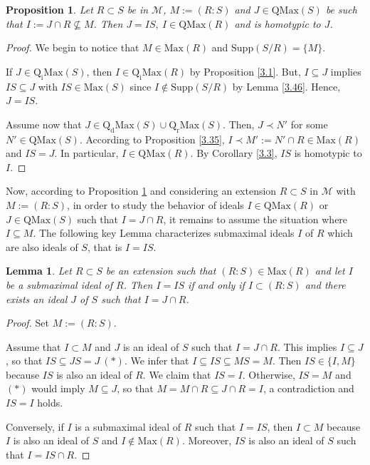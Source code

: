 \documentclass[12pt,leqno]{amsart}
\newtheorem{lemma}[theorem]{Lemma}
\newtheorem{proposition}[theorem]{Proposition}
\theoremstyle{definition}
\begin{document}
\begin{proposition}\label{4.11} Let $R\subset S$ be in $\mathcal M$, $M:= (R:S)$ and $J\in\mathrm{QMax}(S)$ be such that $I:=J\cap R\nsubseteq M$. Then $J=IS,\ I\in\mathrm{QMax}(R)$ and is homotypic to $J$. 
\end{proposition}
\begin{proof} We begin to notice that $M\in\mathrm{Max}(R)$ and $\mathrm {Supp}(S/R)=\{M\}$.
 
If $J\in\mathrm{Q_iMax}(S)$, then $I\in\mathrm{Q_iMax}(R)$ by Proposition \ref{3.1}. But, $I\subseteq J$ implies $IS\subseteq J$ with $IS\in\mathrm{Max}(S)$ since $I\not\in\mathrm{Supp}(S/R)$ by Lemma \ref{3.46}. Hence, $J=IS$. 
 
Assume now that $J\in\mathrm{Q_dMax}(S)\cup\mathrm{Q_rMax}(S)$. Then, $J\prec N'$ for some $N'\in\mathrm{QMax}(S)$. According to Proposition \ref{3.35}, $I\prec M':=N'\cap R\in\mathrm{Max}(R)$ and $IS=J$. In particular, $I\in\mathrm{QMax}(R)$. By Corollary \ref{3.3}, $IS$ is homotypic to $I$. 
\end{proof}

Now, according to Proposition \ref{4.11} and considering an extension $R\subset S$ in $\mathcal M$ with $M:=(R:S)$, in order to study the behavior of ideals $I\in\mathrm{QMax}(R)$ or $J\in\mathrm{QMax}(S)$ such that $I =J\cap R$, it remains to assume the situation where $I\subseteq M$. The following key Lemma characterizes submaximal ideals $I$ of $R$ which are also ideals of $S$, that is $I=IS$.

\begin{lemma}\label{4.3} Let $R\subset S$ be an  extension such that $(R: S)\in\mathrm{Max}(R)$ and let $I$ be a submaximal ideal of $R$. Then $I= IS$ if and only if $I\subset(R:S)$ and there exists an ideal $J$ of $S$ such that $I=J\cap R$. 
\end{lemma}
\begin{proof} Set $M:=(R:S)$. 

Assume that $I\subset M$ and $J$ is an ideal of $S$ such that $I=J\cap R$. This implies $I\subseteq J$, so that $IS\subseteq JS=J\ (*)$. We infer that $I\subseteq IS\subseteq MS=M$. Then $IS\in\{I,M\}$ because $IS$ is also an ideal of $R$. We claim that $IS=I$. Otherwise, $IS=M$ and $(*)$ would imply $M\subseteq J$, so that $M=M\cap R\subseteq J\cap R=I$, a contradiction and  $IS=I$ holds. 
 
Conversely, if $I$ is a submaximal ideal of $R$ such that $I=IS$, then $I\subset M$ because $I$ is also an ideal of $S$ and $I\not\in\mathrm{Max}(R)$. Moreover, $IS$ is also an ideal of $S$ such that $I=IS\cap R$.
\end{proof}
\end{document}
